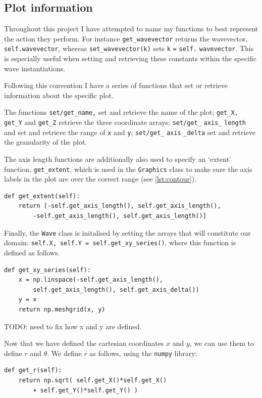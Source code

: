 \subsection{Plot information}
Throughout this project I have attempted to name my functions to best represent the action they perform. For instance \verb!get_wavevector! returns the wavevector, \verb!self.wavevector!, whereas \verb!set_wavevector(k)! sets \verb!k! \verb!=! \verb!self.! \verb!wavevector!. This is especially useful when setting and retrieving these constants within the specific wave instantiations. \par
%
Following this convention I have a series of functions that set or retrieve information about the specific plot. \par
%
The functions \verb!set/get_name,! set and retrieve the name of the plot; \verb!get_X,! \verb!get_Y! and \verb!get_Z! retrieve the three coordinate arrays; \verb!set/get_! \verb!axis_! \verb!length! and set and retrieve the range of \verb!x! and \verb!y!; \verb!set/get_! \verb!axis! \verb!_delta! set and retrieve the granularity of the plot. \par
%
The axis length functions are additionally also used to specify an `extent' function, \verb!get_extent!, which is used in the \verb!Graphics! class to make sure the axis labels in the plot are over the correct range (see \ref{lst:contour}). \par
%
  \begin{lstlisting}
def get_extent(self):
    return [-self.get_axis_length(), self.get_axis_length(),
        -self.get_axis_length(), self.get_axis_length()] \end{lstlisting}
%
Finally, the \verb!Wave! class is initalised by setting the arrays that will constitute our domain: \verb!self.X, self.Y = self.get_xy_series()!, where this function is defined as follows.
%
  \begin{lstlisting}
def get_xy_series(self):
    x = np.linspace(-self.get_axis_length(),
        self.get_axis_length(), self.get_axis_delta())
    y = x
    return np.meshgrid(x, y)\end{lstlisting}
%
TODO: need to fix how x and y are defined.\par
%
Now that we have defined the cartesian coordinates $x$ and $y$, we can use them to define $r$ and $\theta$. We define $r$ as follows, using the \verb!numpy! library:
%
  \begin{lstlisting}
def get_r(self):
    return np.sqrt( self.get_X()*self.get_X()
        + self.get_Y()*self.get_Y() )\end{lstlisting}
